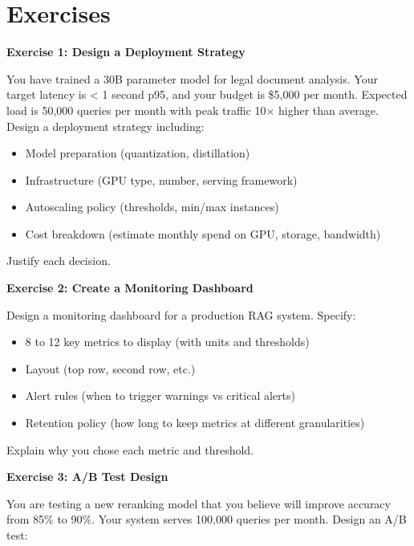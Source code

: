 \vspace{2em}

\section*{Exercises}

\textbf{Exercise 1: Design a Deployment Strategy}

You have trained a 30B parameter model for legal document analysis. Your target latency is < 1 second p95, and your budget is \$5,000 per month. Expected load is 50,000 queries per month with peak traffic 10$\times$ higher than average. Design a deployment strategy including:

\begin{itemize}
\item Model preparation (quantization, distillation)
\item Infrastructure (GPU type, number, serving framework)
\item Autoscaling policy (thresholds, min/max instances)
\item Cost breakdown (estimate monthly spend on GPU, storage, bandwidth)
\end{itemize}

Justify each decision.

\vspace{0.5em}

\textbf{Exercise 2: Create a Monitoring Dashboard}

Design a monitoring dashboard for a production RAG system. Specify:

\begin{itemize}
\item 8 to 12 key metrics to display (with units and thresholds)
\item Layout (top row, second row, etc.)
\item Alert rules (when to trigger warnings vs critical alerts)
\item Retention policy (how long to keep metrics at different granularities)
\end{itemize}

Explain why you chose each metric and threshold.

\vspace{0.5em}

\textbf{Exercise 3: A/B Test Design}

You are testing a new reranking model that you believe will improve accuracy from 85\% to 90\%. Your system serves 100,000 queries per month. Design an A/B test:

